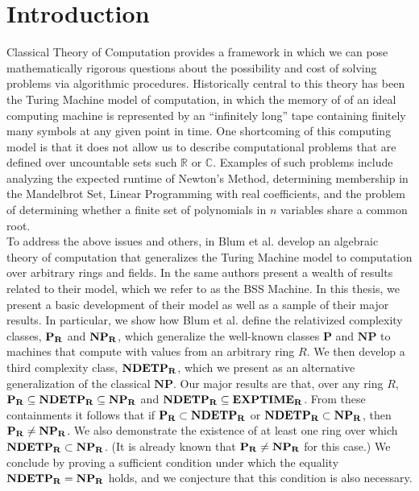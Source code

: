 \chapter{Introduction}

Classical Theory of Computation provides a framework in which we can
pose mathematically rigorous questions about the possibility and cost
of solving problems via algorithmic procedures.  Historically central
to this theory has been the Turing Machine model of computation, in
which the memory of of an ideal computing machine is represented by an
``infinitely long'' tape containing finitely many symbols at any given
point in time.  One shortcoming of this computing model is that it
does not allow us to describe computational problems that are defined
over uncountable sets such $\mathbb{R}$ or $\mathbb{C}$.  Examples of
such problems include analyzing the expected runtime of Newton's
Method, determining membership in the Mandelbrot Set, Linear
Programming with real coefficients, and the problem of determining
whether a finite set of polynomials in $n$ variables share a common
root.\\

To address the above issues and others, in \cite{B89} Blum et
al. develop an algebraic theory of computation that generalizes the
Turing Machine model to computation over arbitrary rings and fields.
In \cite{B98} the same authors present a wealth of results related to
their model, which we refer to as the BSS Machine. In this thesis, we
present a basic development of their model as well as a sample of
their major results.  In particular, we show how Blum et al. define
the relativized complexity classes, $\mathbf{P_R}$ and $\mathbf{NP_R}$, which generalize
the well-known classes $\mathbf{P}$ and $\mathbf{NP}$ to machines that
compute with values from an arbitrary ring $R$.  We then develop a
third complexity class, $\mathbf{NDETP_R}$, which we present as an alternative
generalization of the classical $\mathbf{NP}$.  Our major results are
that, over any ring $R$, $\mathbf{P_R} \subseteq \mathbf{NDETP_R} \subseteq \mathbf{NP_R}$ and
$\mathbf{NDETP_R} \subseteq \mathbf{EXPTIME_R}$. From these containments it follows that
if $\mathbf{P_R} \subset \mathbf{NDETP_R}$ or $\mathbf{NDETP_R} \subset \mathbf{NP_R}$, then $\mathbf{P_R} \neq \mathbf{NP_R}$.
We also demonstrate the existence of at least one ring over which
$\mathbf{NDETP_R} \subset \mathbf{NP_R}$.  (It is already known that $\mathbf{P_R} \neq \mathbf{NP_R}$ for
this case.)  We conclude by proving a sufficient condition under which
the equality $\mathbf{NDETP_R} = \mathbf{NP_R}$ holds, and we conjecture that this
condition is also necessary.

